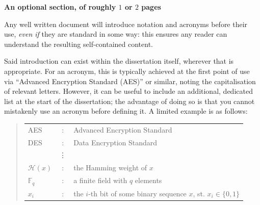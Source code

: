 \documentclass[ %
                    author={Natchalin Iwsakul \\ Inkaphol Siriwongwattana \\ Tanaphan Kummaraphat \\ Patorn Srisupap},
                supervisor={Fernando Moreno-Pino},
                    degree={MSc},
                     title={Propensity Modelling for SME Commercial Lending Using Open Public Data},
                  subtitle={Companies House filings and GDELT media coverage as predictors of first-time borrowing},
                      type={},
                      year={2026}]{dissertation}
\begin{document}
{\bf An optional section, of roughly $1$ or $2$ pages}
\vspace{1cm} 

\noindent
Any well written document will introduce notation and acronyms before
their use, {\em even if} they are standard in some way: this ensures 
any reader can understand the resulting self-contained content.  

Said introduction can exist within the dissertation itself, wherever 
that is appropriate.  For an acronym, this is typically achieved at 
the first point of use via ``Advanced Encryption Standard (AES)'' or 
similar, noting the capitalisation of relevant letters.  However, it 
can be useful to include an additional, dedicated list at the start 
of the dissertation; the advantage of doing so is that you cannot 
mistakenly use an acronym before defining it.  A limited example is 
as follows:

\begin{quote}
\noindent
\begin{tabular}{lcl}
AES                 &:     & Advanced Encryption Standard                                         \\
DES                 &:     & Data Encryption Standard                                             \\
                    &\vdots&                                                                      \\
${\mathcal H}( x )$ &:     & the Hamming weight of $x$                                            \\
${\mathbb  F}_q$    &:     & a finite field with $q$ elements                                     \\
$x_i$               &:     & the $i$-th bit of some binary sequence $x$, st. $x_i \in \{ 0, 1 \}$ \\
\end{tabular}
\end{quote}  


%
\end{document}
